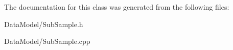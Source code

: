 The documentation for this class was generated from the following files\-:\begin{DoxyCompactItemize}
\item 
Data\-Model/Sub\-Sample.\-h\item 
Data\-Model/Sub\-Sample.\-cpp\end{DoxyCompactItemize}
